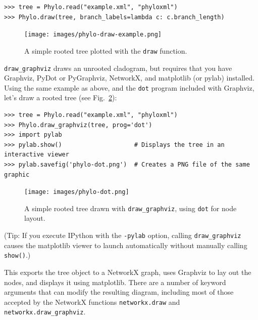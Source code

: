 \documentclass{report}
\begin{document}
\begin{verbatim}
>>> tree = Phylo.read("example.xml", "phyloxml")
>>> Phylo.draw(tree, branch_labels=lambda c: c.branch_length)
\end{verbatim}

\begin{htmlonly}
\label{fig:phylo-draw-example}
\end{htmlonly}

\begin{latexonly}
\begin{figure}[tbp]
\centering
\texttt{[image: images/phylo-draw-example.png]}
\caption{A simple rooted tree plotted with the {\tt draw} function.}
\label{fig:phylo-draw-example}
\end{figure}
\end{latexonly}


\verb|draw_graphviz| draws an unrooted cladogram, but requires that you have Graphviz,
PyDot or PyGraphviz, NetworkX, and matplotlib (or pylab) installed. Using the same example as
above, and the \verb|dot| program included with Graphviz, let's draw a rooted tree (see
Fig.~\ref{fig:phylo-dot}):

\begin{verbatim}
>>> tree = Phylo.read("example.xml", "phyloxml")
>>> Phylo.draw_graphviz(tree, prog='dot')
>>> import pylab
>>> pylab.show()                    # Displays the tree in an interactive viewer
>>> pylab.savefig('phylo-dot.png')  # Creates a PNG file of the same graphic
\end{verbatim}

\begin{htmlonly}
\label{fig:phylo-dot}
\end{htmlonly}

\begin{latexonly}
\begin{figure}[tbp]
\centering
\texttt{[image: images/phylo-dot.png]}
\caption{A simple rooted tree drawn with {\tt draw\_graphviz}, using {\tt dot} for node
layout.}
\label{fig:phylo-dot}
\end{figure}
\end{latexonly}

(Tip: If you execute IPython with the \verb|-pylab| option, calling \verb|draw_graphviz| causes
the matplotlib viewer to launch automatically without manually calling \verb|show()|.)

This exports the tree object to a NetworkX graph, uses Graphviz to lay out the nodes, and
displays it using matplotlib. 
There are a number of keyword arguments that can modify the resulting diagram, including
most of those accepted by the NetworkX functions \verb|networkx.draw| and
\verb|networkx.draw_graphviz|.
\end{document}
